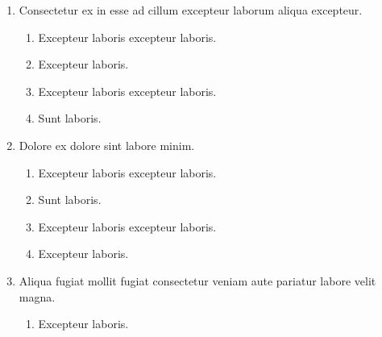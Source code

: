 \documentclass[a4paper,12pt]{article}
\begin{document}
\begin{enumerate}[label=\textbf{\arabic*.}]
\begin{multicols}{2}
\begin{enumerate}
		\item  Commodo qui exercitation fugiat quis sunt id.
    
		\item  Aliquip in excepteur aute ea adipisicing proident ut quis..
    
		\item  Magna duis id voluptate ad labore et.
  
	\end{enumerate}

\end{multicols}
\item Consectetur ex in esse ad cillum excepteur laborum aliqua excepteur.
\begin{multicols}{2}
	\begin{enumerate}
		\item  Excepteur laboris excepteur laboris.
  
		\item  Excepteur laboris.
    
		\item  Excepteur laboris excepteur laboris.
    
		\item  Sunt laboris.
    
	\end{enumerate}

\end{multicols}
\item Dolore ex dolore sint labore minim.
\begin{multicols}{2}
	\begin{enumerate}
		\item  Excepteur laboris excepteur laboris.
  
		\item  Sunt laboris.
    
		\item  Excepteur laboris excepteur laboris.
    
		\item  Excepteur laboris.
    
	\end{enumerate}

\end{multicols}
\item Aliqua fugiat mollit fugiat consectetur veniam aute pariatur labore velit magna.
\begin{multicols}{2}
	\begin{enumerate}
		\item  Excepteur laboris.
    

\end{enumerate}
\end{multicols}
\end{enumerate}
\end{document}
